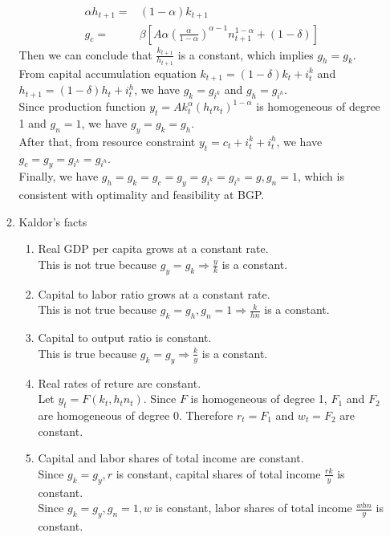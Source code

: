 \documentclass{article}
\begin{document}
\begin{enumerate}
\begin{enumerate}
\begin{align*}
                \alpha h_{t+1}=&(1-\alpha)k_{t+1}\\
                g_c=&\beta\left[A\alpha\left(\frac{\alpha}{1-\alpha}\right)^{\alpha-1}n_{t+1}^{1-\alpha}+(1-\delta)\right]
            \end{align*}
            Then we can conclude that $\frac{k_{t+1}}{h_{t+1}}$ is a constant, which implies $g_h=g_k$.\\
            From  capital accumulation equation $k_{t+1}=(1-\delta)k_t+i_t^k$ and $h_{t+1}=(1-\delta)h_t+i_t^h$, we have $g_k=g_{i^k}$ and $g_h=g_{i^h}$.\\
            Since production function $y_t=Ak_t^\alpha(h_tn_t)^{1-\alpha}$ is homogeneous of degree 1 and $g_n=1$, we have $g_y=g_k=g_h$.\\
            After that, from resource constraint $y_t=c_t+i_t^k+i_t^h$, we have $g_c=g_y=g_{i^k}=g_{i^h}$.\\
            Finally, we have $g_h=g_k=g_c=g_y=g_{i^k}=g_{i^h}=g,g_n=1$, which is consistent with optimality and feasibility at BGP.
            \item Kaldor's facts
            \begin{enumerate}
                \item Real GDP per capita grows at a constant rate.\\
                This is not true because $g_y=g_k\Rightarrow \frac{y}{k}$ is a constant.
                \item Capital to labor ratio grows at a constant rate.\\
                This is not true because $g_k=g_h,g_n=1\Rightarrow \frac{k}{hn}$ is a constant.
                \item Capital to output ratio is constant.\\
                This is true because $g_k=g_y\Rightarrow \frac{k}{y}$ is a constant.
                \item Real rates of reture are constant.\\
                Let $y_t=F(k_t,h_tn_t)$. Since $F$ is homogeneous of degree 1, $F_1$ and $F_2$ are homogeneous of degree 0.
                Therefore $r_t=F_1$ and $w_t=F_2$ are constant.
                \item Capital and labor shares of total income are constant.\\
                Since $g_k=g_y,r$ is constant, capital shares of total income $\frac{rk}{y}$ is constant.\\
                Since $g_k=g_y,g_n=1,w$ is constant, labor shares of total income $\frac{whn}{y}$ is constant.\\

\end{enumerate}
\end{enumerate}
\end{enumerate}
\end{document}
